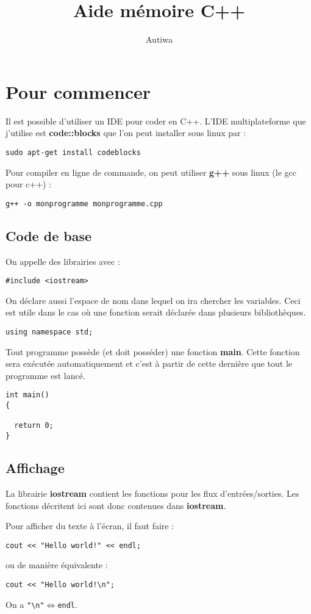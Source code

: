 \documentclass[a4paper,twoside]{article}
\title{Aide mémoire C++}
\author{Autiwa}
\begin{document}
\tableofcontents

\clearpage

\section{Pour commencer}
Il est possible d'utiliser un IDE pour coder en C++. L'IDE multiplateforme que j'utilise est \textbf{code::blocks} que l'on 
peut installer sous linux par :
\begin{verbatim}
sudo apt-get install codeblocks
\end{verbatim}

Pour compiler en ligne de commande, on peut utiliser \textbf{g++} sous linux (le gcc pour c++) :
\begin{verbatim}
g++ -o monprogramme monprogramme.cpp
\end{verbatim}

\subsection{Code de base}
On appelle des librairies avec :
\begin{verbatim}
#include <iostream>
\end{verbatim}

\bigskip

On déclare aussi l'espace de nom dans lequel on ira chercher les variables. Ceci est utile dans le cas où une fonction serait 
déclarée dans plusieurs bibliothèques. 
\begin{verbatim}
using namespace std;
\end{verbatim}

\bigskip

Tout programme possède (et doit posséder) une fonction \textbf{main}. Cette fonction sera exécutée automatiquement et c'est à 
partir de cette dernière que tout le programme est lancé. 
\begin{verbatim}
int main()
{

  return 0;
}

\end{verbatim}

\subsection{Affichage}
La librairie \textbf{iostream} contient les fonctions pour les flux d'entrées/sorties. Les fonctions décritent ici sont donc 
contenues dans \textbf{iostream}.

Pour afficher du texte à l'écran, il faut faire :
\begin{verbatim}
cout << "Hello world!" << endl;
\end{verbatim}
ou de manière équivalente :
\begin{verbatim}
cout << "Hello world!\n";
\end{verbatim}

On a \verb|"\n"|$\Leftrightarrow$\verb|endl|. 
\end{document}
